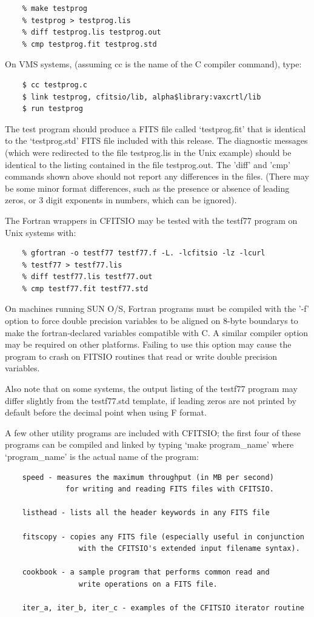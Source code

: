 \documentclass[11pt]{book}
\begin{document}
\begin{verbatim}
    % make testprog
    % testprog > testprog.lis
    % diff testprog.lis testprog.out
    % cmp testprog.fit testprog.std
\end{verbatim}
 On VMS systems,
(assuming cc is the name of the C compiler command), type:

\begin{verbatim}
    $ cc testprog.c
    $ link testprog, cfitsio/lib, alpha$library:vaxcrtl/lib
    $ run testprog
\end{verbatim}
The test program should produce a FITS file called `testprog.fit'
that is identical to the `testprog.std' FITS file included with this
release.  The diagnostic messages (which were redirected to the file
testprog.lis in the Unix example) should be identical to the listing
contained in the file testprog.out.  The 'diff' and 'cmp' commands
shown above should not report any differences in the files.  (There
may be some minor format differences, such as the presence or
absence of leading zeros, or 3 digit exponents in numbers,
which can be ignored).

The Fortran wrappers in CFITSIO may be tested with the testf77
program on Unix systems with:

\begin{verbatim}
    % gfortran -o testf77 testf77.f -L. -lcfitsio -lz -lcurl
    % testf77 > testf77.lis
    % diff testf77.lis testf77.out
    % cmp testf77.fit testf77.std
\end{verbatim}
On machines running SUN O/S, Fortran programs must be compiled with the
'-f' option to force double precision variables to be aligned on 8-byte
boundarys to make the fortran-declared variables compatible with C.  A
similar compiler option may be required on other platforms.  Failing to
use this option may cause the program to crash on FITSIO routines that
read or write double precision variables.

Also note that on some systems, the output listing of the testf77
program may differ slightly from the testf77.std template, if leading
zeros are not printed by default before the decimal point when using F
format.

A few other utility programs are included with CFITSIO; the first four
of these programs can be compiled and linked by typing `make
program\_name' where `program\_name' is the actual name of the program:

\begin{verbatim}
    speed - measures the maximum throughput (in MB per second)
              for writing and reading FITS files with CFITSIO.

    listhead - lists all the header keywords in any FITS file

    fitscopy - copies any FITS file (especially useful in conjunction
                 with the CFITSIO's extended input filename syntax).

    cookbook - a sample program that performs common read and
                 write operations on a FITS file.

    iter_a, iter_b, iter_c - examples of the CFITSIO iterator routine
\end{verbatim}
\end{document}
